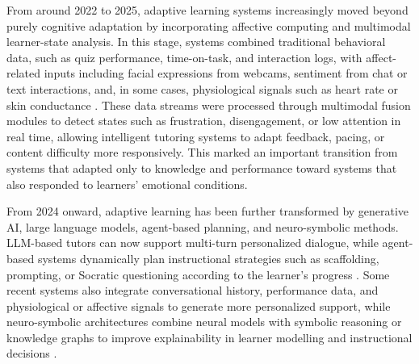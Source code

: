 From around 2022 to 2025, adaptive learning systems increasingly moved beyond purely cognitive adaptation by incorporating affective computing and multimodal learner-state analysis. In this stage, systems combined traditional behavioral data, such as quiz performance, time-on-task, and interaction logs, with affect-related inputs including facial expressions from webcams, sentiment from chat or text interactions, and, in some cases, physiological signals such as heart rate or skin conductance \cite{Akavova2023Adaptive,Rane2023Education,Gkintoni2025Challenging}. These data streams were processed through multimodal fusion modules to detect states such as frustration, disengagement, or low attention in real time, allowing intelligent tutoring systems to adapt feedback, pacing, or content difficulty more responsively. This marked an important transition from systems that adapted only to knowledge and performance toward systems that also responded to learners’ emotional conditions.

From 2024 onward, adaptive learning has been further transformed by generative AI, large language models, agent-based planning, and neuro-symbolic methods. LLM-based tutors can now support multi-turn personalized dialogue, while agent-based systems dynamically plan instructional strategies such as scaffolding, prompting, or Socratic questioning according to the learner’s progress \cite{Kabudi2021AI-enabled,Khosravi2020Development,Katsaris2021Adaptive}. Some recent systems also integrate conversational history, performance data, and physiological or affective signals to generate more personalized support, while neuro-symbolic architectures combine neural models with symbolic reasoning or knowledge graphs to improve explainability in learner modelling and instructional decisions \cite{Khosravi2020Development,Katsaris2021Adaptive}.
